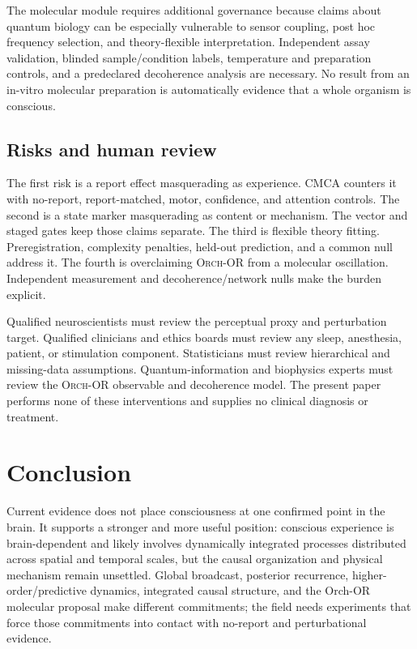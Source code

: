 \documentclass[conference]{IEEEtran}
\newcommand{\ORCH}{\textsc{Orch-OR}}
\begin{document}
The molecular module requires additional governance because claims about quantum biology can be especially vulnerable to sensor coupling, post hoc frequency selection, and theory-flexible interpretation. Independent assay validation, blinded sample/condition labels, temperature and preparation controls, and a predeclared decoherence analysis are necessary. No result from an in-vitro molecular preparation is automatically evidence that a whole organism is conscious.

\subsection{Risks and human review}

The first risk is a report effect masquerading as experience. CMCA counters it with no-report, report-matched, motor, confidence, and attention controls. The second is a state marker masquerading as content or mechanism. The vector and staged gates keep those claims separate. The third is flexible theory fitting. Preregistration, complexity penalties, held-out prediction, and a common null address it. The fourth is overclaiming \ORCH{} from a molecular oscillation. Independent measurement and decoherence/network nulls make the burden explicit.

Qualified neuroscientists must review the perceptual proxy and perturbation target. Qualified clinicians and ethics boards must review any sleep, anesthesia, patient, or stimulation component. Statisticians must review hierarchical and missing-data assumptions. Quantum-information and biophysics experts must review the \ORCH{} observable and decoherence model. The present paper performs none of these interventions and supplies no clinical diagnosis or treatment.

\section{Conclusion}

Current evidence does not place consciousness at one confirmed point in the brain. It supports a stronger and more useful position: conscious experience is brain-dependent and likely involves dynamically integrated processes distributed across spatial and temporal scales, but the causal organization and physical mechanism remain unsettled. Global broadcast, posterior recurrence, higher-order/predictive dynamics, integrated causal structure, and the Orch-OR molecular proposal make different commitments; the field needs experiments that force those commitments into contact with no-report and perturbational evidence.
\end{document}
